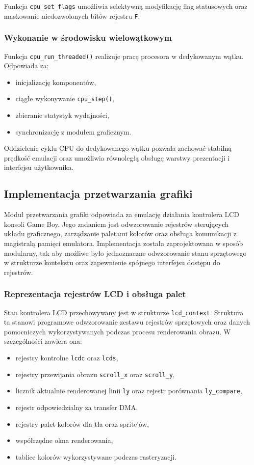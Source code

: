 \documentclass{article}
\begin{document}
Funkcja \texttt{cpu\_set\_flags} umożliwia selektywną modyfikację flag statusowych oraz maskowanie niedozwolonych bitów rejestru \texttt{F}.

\subsubsection{Wykonanie w środowisku wielowątkowym}

Funkcja \texttt{cpu\_run\_threaded()} realizuje pracę procesora w dedykowanym wątku. Odpowiada za:
\begin{itemize}
	\item inicjalizację komponentów,
	\item ciągłe wykonywanie \texttt{cpu\_step()},
	\item zbieranie statystyk wydajności,
	\item synchronizację z modułem graficznym.
\end{itemize}

Oddzielenie cyklu CPU do dedykowanego wątku pozwala zachować stabilną prędkość emulacji oraz umożliwia równoległą obsługę warstwy prezentacji i interfejsu użytkownika.
\subsection{Implementacja przetwarzania grafiki}

Moduł przetwarzania grafiki odpowiada za emulację działania kontrolera LCD konsoli Game Boy. Jego zadaniem jest odwzorowanie rejestrów sterujących układu graficznego, zarządzanie paletami kolorów oraz obsługa komunikacji z magistralą pamięci emulatora. Implementacja została zaprojektowana w sposób modularny, tak aby możliwe było jednoznaczne odwzorowanie stanu sprzętowego w strukturze kontekstu oraz zapewnienie spójnego interfejsu dostępu do rejestrów.

\subsubsection{Reprezentacja rejestrów LCD i obsługa palet}

Stan kontrolera LCD przechowywany jest w strukturze \texttt{lcd\_context}. Struktura ta stanowi programowe odwzorowanie zestawu rejestrów sprzętowych oraz danych pomocniczych wykorzystywanych podczas procesu renderowania obrazu. W szczególności zawiera ona:

\begin{itemize}
	\item rejestry kontrolne \texttt{lcdc} oraz \texttt{lcds},
	\item rejestry przewijania obrazu \texttt{scroll\_x} oraz \texttt{scroll\_y},
	\item licznik aktualnie renderowanej linii \texttt{ly} oraz rejestr porównania \texttt{ly\_compare},
	\item rejestr odpowiedzialny za transfer DMA,
	\item rejestry palet kolorów dla tła oraz sprite'ów,
	\item współrzędne okna renderowania,
	\item tablice kolorów wykorzystywane podczas rasteryzacji.
\end{itemize}
\end{document}
